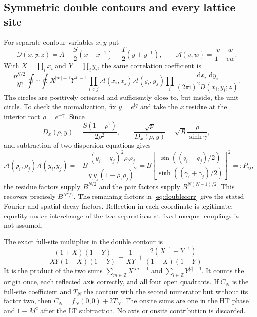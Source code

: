 \documentclass[11pt]{article}
\numberwithin{equation}{section}
\theoremstyle{definition}
\newcommand{\Z}{\mathbb Z}
\newcommand{\dd}{\,\mathrm d}
\newcommand{\ii}{\mathrm i}
\newcommand{\cA}{\mathscr A}
\begin{document}
\subsection{Symmetric double contours and every lattice site}
For separate contour variables $x,y$ put
\begin{equation}\label{eq:Dpoly}
 D(x,y;z)=A-\frac S2(x+x^{-1})-\frac T2(y+y^{-1}),\qquad
 \cA(v,w)=\frac{v-w}{1-vw}.
\end{equation}
With $X=\prod_i x_i$ and $Y=\prod_i y_i$, the same correlation
coefficient is
\begin{equation}\label{eq:doublecorr}
 \frac{p^{N/2}}{N!}\oint\cdots\oint
 X^{|m|-1}Y^{|l|-1}
 \prod_{i<j}\cA(x_i,x_j)\cA(y_i,y_j)
 \prod_i\frac{\dd x_i\,\dd y_i}{(2\pi\ii)^2D(x_i,y_i;z)}.
\end{equation}
The circles are positively oriented and sufficiently close to, but inside,
the unit circle. To check the normalization, fix $y=e^{\ii q}$ and
take the $x$ residue at the interior root $\rho=e^{-\gamma}$.
Since
\[
 D_x(\rho,y)=\frac{S(1-\rho^2)}{2\rho^2},\qquad
 \frac{\sqrt p}{D_x(\rho,y)}=\sqrt B\frac{\rho}{\sinh\gamma},
\]
and subtraction of two dispersion equations gives
\begin{equation}\label{eq:cancelpair}
 \cA(\rho_i,\rho_j)\cA(y_i,y_j)
 =-B\frac{(y_i-y_j)^2\rho_i\rho_j}
           {y_iy_j(1-\rho_i\rho_j)^2}
 =B\left[\frac{\sin((q_i-q_j)/2)}
               {\sinh((\gamma_i+\gamma_j)/2)}\right]^2=:P_{ij},
\end{equation}
the residue factors supply $B^{N/2}$ and the pair factors supply
$B^{N(N-1)/2}$. This recovers precisely $B^{N^2/2}$.
The remaining factors in \eqref{eq:doublecorr} give the stated Fourier
and spatial decay factors. Reflection in each coordinate is legitimate;
equality under interchange of the two separations at fixed unequal
couplings is not assumed.

The exact full-site multiplier in the double contour is
\begin{equation}\label{eq:allsites}
 \frac{(1+X)(1+Y)}{XY(1-X)(1-Y)}
 =\frac1{XY}+\frac{2(X^{-1}+Y^{-1})}{(1-X)(1-Y)}.
\end{equation}
It is the product of the two sums $\sum_{m\in\Z}X^{|m|-1}$ and
$\sum_{l\in\Z}Y^{|l|-1}$. It counts the origin once, each reflected
axis correctly, and all four open quadrants. If $C_N$ is the full-site
coefficient and $T_N$ the contour with the second numerator but without
its factor two, then $C_N=f_N(0,0)+2T_N$. The onsite sums are one in
the HT phase and $1-M^2$ after the LT subtraction. No axis or onsite
contribution is discarded.
\end{document}
